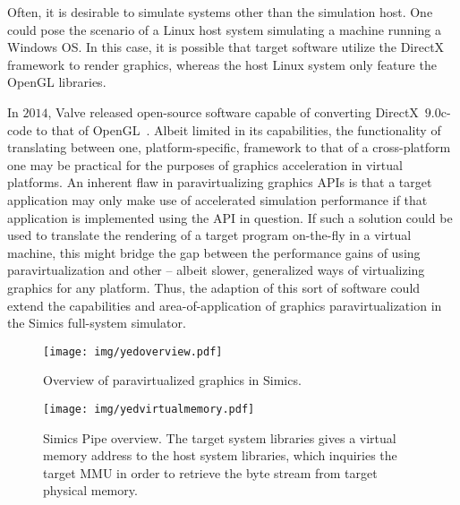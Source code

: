 \documentclass{article}
\newcommand{\masccite}[2][]{\cite{#2}}
\begin{document}
Often, it is desirable to simulate systems other than the simulation host.
One could pose the scenario of a Linux host system simulating a machine running a Windows OS.
In this case, it is possible that target software utilize the DirectX framework to render graphics, whereas the host Linux system only feature the OpenGL libraries.

In $2014$, Valve released open-source software capable of converting DirectX~$9.0$c-code to that of OpenGL~\masccite{technicaldocs:valve:2014}.
Albeit limited in its capabilities, the functionality of translating between one, platform-specific, framework to that of a cross-platform one may be practical for the purposes of graphics acceleration in virtual platforms.
An inherent flaw in paravirtualizing graphics APIs is that a target application may only make use of accelerated simulation performance if that application is implemented using the API in question.
If such a solution could be used to translate the rendering of a target program on-the-fly in a virtual machine, this might bridge the gap between the performance gains of using paravirtualization and other -- albeit slower, generalized ways of virtualizing graphics for any platform.
Thus, the adaption of this sort of software could extend the capabilities and area-of-application of graphics paravirtualization in the Simics full-system simulator.




\begin{figure}
\centering
\texttt{[image: img/yedoverview.pdf]}
\caption{Overview of paravirtualized graphics in Simics.}
\label{fig:overview}
\end{figure}

\begin{figure}
\centering
\texttt{[image: img/yedvirtualmemory.pdf]}
\caption{Simics Pipe overview. The target system libraries gives a virtual memory address to the host system libraries, which inquiries the target MMU in order to retrieve the byte stream from target physical memory.}
\label{fig:virtualmemory}
\end{figure}

\providecommand{\chesskeyone}{$60\times60$ tiles}
\providecommand{\chesskeytwo}{$84\times84$ tiles}
\providecommand{\chesskeythree}{$118\times118$ tiles}

\providecommand{\juliakeyone}{$225$ iterations}
\providecommand{\juliakeytwo}{$450$ iterations}
\providecommand{\juliakeythree}{$900$ iterations}
\end{document}
